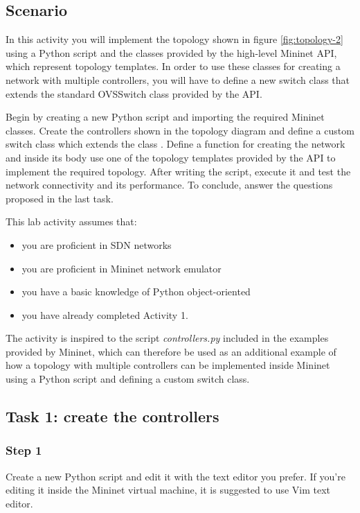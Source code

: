 \subsection*{Scenario}
In this activity you will implement the topology shown in figure \ref{fig:topology-2} using
a Python script and the classes provided by the high-level Mininet API, which
represent topology templates. In order to use these classes for creating a network
with multiple controllers, you will have to define a new switch class that extends
the standard OVSSwitch class provided by the API.

Begin by creating a new Python script and importing the required Mininet classes.
Create the controllers shown in the topology diagram and define
a custom switch class which extends the class . Define a function for creating
the network and inside its body use one of the topology templates provided
by the API to implement the required topology.
After writing the script, execute it and test the network connectivity and its
performance. To conclude, answer the questions proposed in the last task.

This lab activity assumes that:
\begin{itemize}
  \item you are proficient in SDN networks
  \item you are proficient in Mininet network emulator
  \item you have a basic knowledge of Python object-oriented
  \item you have already completed Activity 1.
\end{itemize}

The activity is inspired to the script \textit{controllers.py} \cite{ref-6} included in the
examples provided by Mininet, which can therefore be used as
an additional example of how a topology with multiple controllers can be implemented
inside Mininet using a Python script and defining a custom switch class.





\subsection*{Task 1: create the controllers}
\subsubsection*{Step 1}
Create a new Python script and edit it with the text editor you prefer. If you're editing
it inside the Mininet virtual machine, it is suggested to use Vim text editor.

